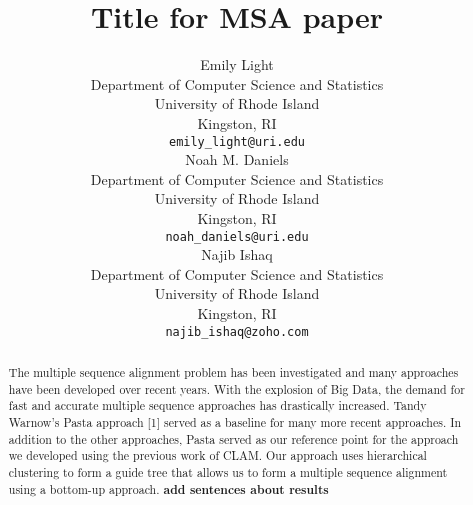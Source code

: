 \documentclass{article}
\begin{document}
\title{Title for MSA paper}

\author{
    Emily Light \\
    Department of Computer Science and Statistics\\
    University of Rhode Island\\
    Kingston, RI\\
    \texttt{emily\_light@uri.edu} \\
    \And
    Noah M. Daniels \\
    Department of Computer Science and Statistics\\
    University of Rhode Island\\
    Kingston, RI\\
    \texttt{noah\_daniels@uri.edu} \\
    \And
    Najib Ishaq \\
    Department of Computer Science and Statistics\\
    University of Rhode Island\\
    Kingston, RI\\
    \texttt{najib\_ishaq@zoho.com} \\
}

\maketitle

\begin{abstract}
        The multiple sequence alignment problem has been investigated and many approaches have been developed over recent years. With the explosion of Big Data, the demand for fast and accurate multiple sequence approaches has drastically increased. Tandy Warnow's Pasta approach [1] served as a baseline for many more recent approaches. In addition to the other approaches, Pasta served as our reference point for the approach we developed using the previous work of CLAM. Our approach uses hierarchical clustering to form a guide tree that allows us to form a multiple sequence alignment using a bottom-up approach. \textbf{add sentences about results}
\end{abstract}









\end{document}
